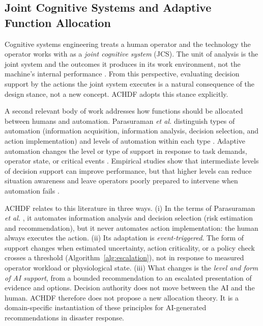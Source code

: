 \documentclass[journal]{IEEEtran}
\theoremstyle{plain}
\theoremstyle{definition}
\providecommand{\DIFaddtex}[1]{{\protect\color{blue} \sf #1}} %
\providecommand{\DIFaddend}{} %
\providecommand{\DIFadd}[1]{\texorpdfstring{\DIFaddtex{#1}}{#1}} %
\DeclareRobustCommand{\DIFaddend}{\DIFOaddend \let\includegraphics\DIFOincludegraphics} %
\begin{document}
\subsection{\DIFadd{Joint Cognitive Systems and Adaptive Function Allocation}}
\DIFadd{Cognitive systems engineering treats a human operator and the technology the operator works with as a \emph{joint cognitive system} (JCS). The unit of analysis is the joint system and the outcomes it produces in its work environment, not the machine's internal performance \cite{Hollnagel2005JCS,Woods2006JCS}. From this perspective, evaluating decision support by the actions the joint system executes is a natural consequence of the design stance, not a new concept. ACHDF adopts this stance explicitly.
}

\DIFadd{A second relevant body of work addresses how functions should be allocated between humans and automation. Parasuraman \emph{et al.} distinguish types of automation (information acquisition, information analysis, decision selection, and action implementation) and levels of automation within each type \cite{Parasuraman2000LOA}. Adaptive automation changes the level or type of support in response to task demands, operator state, or critical events \cite{Scerbo2007,Kaber2004}. Empirical studies show that intermediate levels of decision support can improve performance, but that higher levels can reduce situation awareness and leave operators poorly prepared to intervene when automation fails \cite{Kaber2004,Parasuraman2010}.
}

\DIFadd{ACHDF relates to this literature in three ways. (i) In the terms of Parasuraman \emph{et al.} \cite{Parasuraman2000LOA}, it automates information analysis and decision selection (risk estimation and recommendation), but it never automates action implementation: the human always executes the action. (ii) Its adaptation is \emph{event-triggered}. The form of support changes when estimated uncertainty, action criticality, or a policy check crosses a threshold (Algorithm~\ref{alg:escalation}), not in response to measured operator workload or physiological state. (iii) What changes is the \emph{level and form of AI support}, from a bounded recommendation to an escalated presentation of evidence and options. Decision authority does not move between the AI and the human. ACHDF therefore does not propose a new allocation theory. It is a domain-specific instantiation of these principles for AI-generated recommendations in disaster response}\DIFaddend .
\end{document}
